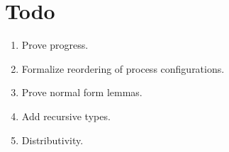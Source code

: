 \documentclass[11pt]{article}
\theoremstyle{plain}
\theoremstyle{definition}
\theoremstyle{remark}
\DeclarePairedDelimiter\parens{(}{)}             %
\newcommand\lolli{\multimap}
\newcommand\intersect{\mathbin{\sqcap}}
\newcommand\irb[1]{\texttt{#1}}
\newcommand{\emptyCtx}{\emptyset}
\newcommand\typeProc[3]{#1 :: \parens{#2 : #3}}
\newcommand\typeS[4]{#1 \vdash \typeProc{#2}{#3}{#4}}
\newcommand\proc[2]{\irb{proc}_{#1}\parens{#2}}
\newcommand\pred[1]{\mathcal{P}\parens*{#1}}
\begin{document}

\section{Todo}

\begin{enumerate}
  \item Prove progress.
  \item Formalize reordering of process configurations.
  \item Prove normal form lemmas.
  \item Add recursive types.
  \item Distributivity.
\end{enumerate}
\end{document}
